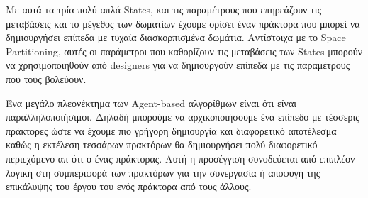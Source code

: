 Με αυτά τα τρία πολύ απλά States, και τις παραμέτρους που επηρεάζουν τις μεταβάσεις και το μέγεθος των δωματίων έχουμε ορίσει έναν πράκτορα που μπορεί να δημιουργήσει επίπεδα με τυχαία διασκορπισμένα δωμάτια. Αντίστοιχα με το Space Partitioning, αυτές οι παράμετροι που καθορίζουν τις μεταβάσεις των States μπορούν να χρησιμοποιηθούν από designers για να δημιουργούν επίπεδα με τις παραμέτρους που τους βολεύουν.
\par
Ένα μεγάλο πλεονέκτημα των Agent-based αλγορίθμων είναι ότι είναι παραλληλοποιήσιμοι. Δηλαδή μπορούμε να αρχικοποιήσουμε ένα επίπεδο με τέσσερις πράκτορες ώστε να έχουμε πιο γρήγορη δημιουργία και διαφορετικό αποτέλεσμα καθώς η εκτέλεση τεσσάρων πρακτόρων θα δημιουργήσει πολύ διαφορετικό περιεχόμενο απ ότι ο ένας πράκτορας. Αυτή η προσέγγιση συνοδεύεται από επιπλέον λογική στη συμπεριφορά των πρακτόρων για την συνεργασία ή αποφυγή της επικάλυψης του έργου του ενός πράκτορα από τους άλλους.

